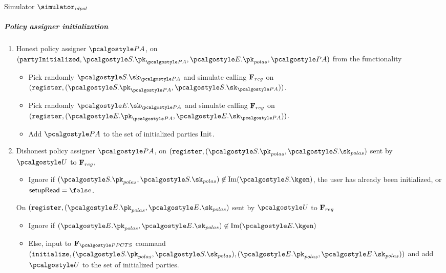 \documentclass[runningheads,10pt]{llncs}
\numberwithin{equation}{section}
\begin{document}
\begin{simbox}{Simulator $\simulator_{idpol}$}
  \subparagraph{Policy assigner initialization}
  \begin{enumerate}
  \item Honest policy assigner $\polas$, on
    $(\partyInitialized, \SIG.\pk_{\polas}, \ENC.\pk_{polas}, \polas)$ from the functionality
    \begin{itemize}
    \item Pick randomly $\SIG.\sk_{\polas}$ and simulate calling $\mathbf{F}_{{reg}}$ on
      $(\register, (\SIG.\pk_{\polas}, \SIG.\sk_{\polas}))$.
    \item Pick randomly $\ENC.\sk_{\polas}$ and simulate calling $\mathbf{F}_{{reg}}$ on
      $(\register, (\ENC.\pk_{\polas}, \ENC.\sk_{\polas}))$.
    \item Add $\polas$ to the set of initialized parties
      $\mathrm{Init}$. 
    \end{itemize}
  \item Dishonest policy assigner $\polas$, on
    $(\register, (\SIG.\pk_{polas}, \SIG.\sk_{polas})$ sent by $\user$ to $\mathbf{F}_{{reg}}$,
    \begin{itemize}
    \item Ignore if $(\SIG.\pk_{polas}, \SIG.\sk_{polas}) \not\in \IM (\SIG.\kgen)$, the user has already been initialized, or
      $\flag{setupRead} = \false$.
    \end{itemize}
    On $(\register, (\ENC.\pk_{polas}, \ENC.\sk_{polas})$ sent by $\user$ to
    $\mathbf{F}_{{reg}}$
    \begin{itemize}
    \item Ignore if $(\ENC.\pk_{polas}, \ENC.\sk_{polas}) \not\in \IM (\ENC.\kgen)$
    \item Else, input to $\func{\PPCTS}$ command
    $(\initialize, (\SIG.\pk_{polas}, \SIG.\sk_{polas}), (\ENC.\pk_{polas},
    \ENC.\sk_{polas}))$ and add $\user$ to the set of initialized parties.
    \end{itemize}
  \end{enumerate}


\end{simbox}
\end{document}
